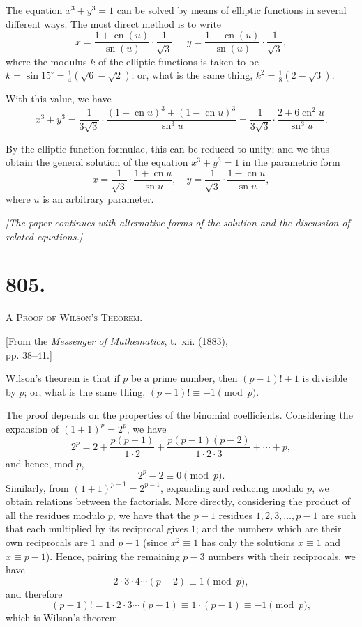 \documentclass[11pt,a4paper]{article}
\DeclareMathOperator{\sn}{sn}
\DeclareMathOperator{\cn}{cn}
\theoremstyle{definition}
\theoremstyle{remark}
\begin{document}
The equation $x^3 + y^3 = 1$ can be solved by means of elliptic functions in several different ways. The most direct method is to write
\[
x = \frac{1 + \cn(u)}{\sn(u)} \cdot \frac{1}{\sqrt{3}}, \quad y = \frac{1 - \cn(u)}{\sn(u)} \cdot \frac{1}{\sqrt{3}},
\]
where the modulus $k$ of the elliptic functions is taken to be $k = \sin 15^\circ = \frac{1}{4}(\sqrt{6} - \sqrt{2})$; or, what is the same thing, $k^2 = \frac{1}{8}(2 - \sqrt{3})$.

With this value, we have
\[
x^3 + y^3 = \frac{1}{3\sqrt{3}} \cdot \frac{(1 + \cn u)^3 + (1 - \cn u)^3}{\sn^3 u} = \frac{1}{3\sqrt{3}} \cdot \frac{2 + 6\cn^2 u}{\sn^3 u}.
\]

By the elliptic-function formulae, this can be reduced to unity; and we thus obtain the general solution of the equation $x^3 + y^3 = 1$ in the parametric form
\[
x = \frac{1}{\sqrt{3}} \cdot \frac{1 + \cn u}{\sn u}, \quad y = \frac{1}{\sqrt{3}} \cdot \frac{1 - \cn u}{\sn u},
\]
where $u$ is an arbitrary parameter.

\vspace{0.5cm}
\noindent\textit{[The paper continues with alternative forms of the solution and the discussion of related equations.]}
\vspace{0.5cm}



\newpage
\section*{805.}
\begin{center}
{\large\scshape A Proof of Wilson's Theorem.}
\end{center}

\begin{flushright}
\small[From the \textit{Messenger of Mathematics}, t.~xii. (1883),\\
pp. 38--41.]
\end{flushright}

Wilson's theorem is that if $p$ be a prime number, then $(p-1)! + 1$ is divisible by $p$; or, what is the same thing, $(p-1)! \equiv -1 \pmod{p}$.

The proof depends on the properties of the binomial coefficients. Considering the expansion of $(1 + 1)^p = 2^p$, we have
\[
2^p = 2 + \frac{p(p-1)}{1 \cdot 2} + \frac{p(p-1)(p-2)}{1 \cdot 2 \cdot 3} + \cdots + p,
\]
and hence, mod $p$,
\[
2^p - 2 \equiv 0 \pmod{p}.
\]
Similarly, from $(1 + 1)^{p-1} = 2^{p-1}$, expanding and reducing modulo $p$, we obtain relations between the factorials. More directly, considering the product of all the residues modulo $p$, we have that the $p-1$ residues $1, 2, 3, \ldots, p-1$ are such that each multiplied by its reciprocal gives $1$; and the numbers which are their own reciprocals are $1$ and $p-1$ (since $x^2 \equiv 1$ has only the solutions $x \equiv 1$ and $x \equiv p-1$). Hence, pairing the remaining $p-3$ numbers with their reciprocals, we have
\[
2 \cdot 3 \cdot 4 \cdots (p-2) \equiv 1 \pmod{p},
\]
and therefore
\[
(p-1)! = 1 \cdot 2 \cdot 3 \cdots (p-1) \equiv 1 \cdot (p-1) \equiv -1 \pmod{p},
\]
which is Wilson's theorem.
\end{document}
